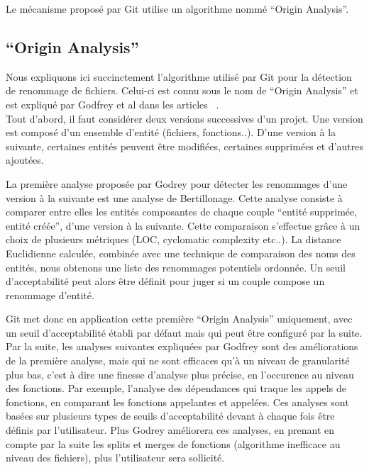 Le mécanisme proposé par Git utilise un algorithme nommé ``Origin Analysis''.

\subsection{``Origin Analysis''}

Nous expliquons ici succinctement l'algorithme utilisé par Git pour la détection de renommage de fichiers. Celui-ci est connu sous le nom de ``Origin Analysis'' et est expliqué par Godfrey et al dans les articles ~\cite{tu_integrated_2002,godfrey_tracking_2002,godfrey_using_2005}.\\

Tout d'abord, il faut considérer deux versions successives d'un projet. Une version est composé d'un ensemble d'entité (fichiers, fonctions..). D'une version à la suivante, certaines entités peuvent être modifiées, certaines supprimées et d'autres ajoutées.

La première analyse proposée par Godrey pour détecter les renommages d'une version à la suivante est une analyse de Bertillonage. Cette analyse consiste à comparer entre elles les entités composantes de chaque couple ``entité supprimée, entité créée'', d'une version à la suivante. Cette comparaison s'effectue grâce à un choix de plusieurs métriques (LOC, cyclomatic complexity etc..). La distance Euclidienne calculée, combinée avec une technique de comparaison des noms des entités, nous obtenons une liste des renommages potentiels ordonnée. Un seuil d'acceptabilité peut alors être définit pour juger si un couple compose un renommage d'entité.

Git met donc en application cette première ``Origin Analysis'' uniquement, avec un seuil d'acceptabilité établi par défaut mais qui peut être configuré par la suite.\\

Par la suite, les analyses suivantes expliquées par Godfrey sont des améliorations de la première analyse, mais qui ne sont efficaces qu'à un niveau de granularité plus bas, c'est à dire une finesse d'analyse plus précise, en l'occurence au niveau des fonctions. Par exemple, l'analyse des dépendances qui traque les appels de fonctions, en comparant les fonctions appelantes et appelées. Ces analyses sont basées sur plusieurs types de seuils d'acceptabilité devant à chaque fois être définis par l'utilisateur. Plus Godrey améliorera ces analyses, en prenant en compte par la suite les splits et merges de fonctions (algorithme inefficace au niveau des fichiers), plus l'utilisateur sera sollicité.\\


